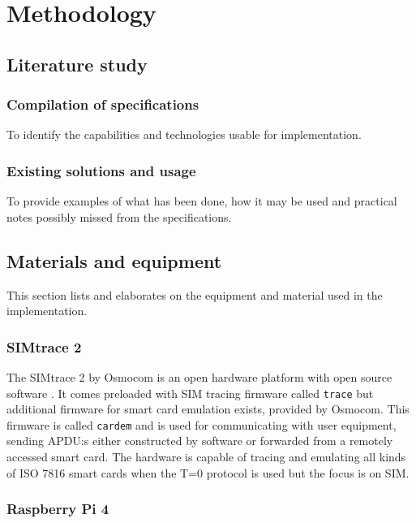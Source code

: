 \chapter{Methodology}

\section{Literature study}

\subsection{Compilation of specifications}

To identify the capabilities and technologies usable for
implementation.

\subsection{Existing solutions and usage}

To provide examples of what has been done, how it may be used and
practical notes possibly missed from the specifications.

\section{Materials and equipment}
\label{sec:materials-and-equipment}

This section lists and elaborates on the equipment and material
used in the implementation.

\subsection{SIMtrace 2}

The SIMtrace 2 by Osmocom is an open hardware platform with open
source software \cite{simtrace}. It comes preloaded with SIM
tracing firmware called \verb|trace| \cite{simtrace-wiki} but
additional firmware for smart card emulation exists, provided by
Osmocom. This firmware is called \verb|cardem|
\cite{simtrace-wiki} and is used for communicating with user
equipment, sending APDU:s either constructed by software or
forwarded from a remotely accessed smart card. The hardware is
capable of tracing and emulating all kinds of ISO 7816
\cite{iso7816} smart cards when the T=0 protocol is used
\cite{simtrace-wiki} but the focus is on SIM.

\subsection{Raspberry Pi 4}

